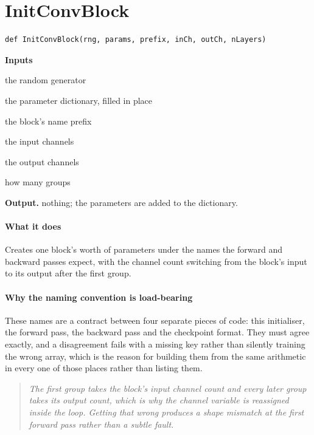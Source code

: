 \section{InitConvBlock}
\begin{lstlisting}[style=sig]
def InitConvBlock(rng, params, prefix, inCh, outCh, nLayers)
\end{lstlisting}

\noindent\textbf{Inputs}
\begin{description}[leftmargin=2.2em,style=nextline,font=\normalfont\ttfamily]\setlength\itemsep{1pt}
  \item[{rng}] \normalfont the random generator
  \item[{params}] \normalfont the parameter dictionary, filled in place
  \item[{prefix}] \normalfont the block's name prefix
  \item[{inCh}] \normalfont the input channels
  \item[{outCh}] \normalfont the output channels
  \item[{nLayers}] \normalfont how many groups
\end{description}

\noindent\textbf{Output.} nothing; the parameters are added to the dictionary.


\paragraph{What it does}
Creates one block's worth of parameters under the names the forward and backward passes expect, with the channel count switching from the block's input to its output after the first group.


\paragraph{Why the naming convention is load-bearing}
These names are a contract between four separate pieces of code: this initialiser, the forward pass, the backward pass and the checkpoint format. They must agree exactly, and a disagreement fails with a missing key rather than silently training the wrong array, which is the reason for building them from the same arithmetic in every one of those places rather than listing them.


\begin{quote}\small\itshape The first group takes the block's input channel count and every later group takes its output count, which is why the channel variable is reassigned inside the loop. Getting that wrong produces a shape mismatch at the first forward pass rather than a subtle fault.\end{quote}


